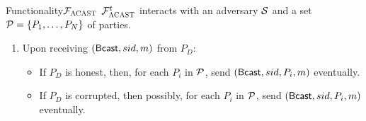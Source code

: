 \documentclass{llncs}
\begin{document}
\begin{boxdef}{Functionality}{$\mathcal{{F}}_{\textsc{ACAST}}$}
  $\mathcal{{F}}_{\textsc{ACAST}}^t$ interacts with an adversary $\mathcal{{S}}$ and a set $\mathcal{{P}} = \{
  P_1, \ldots, P_N \}$ of parties.
  \begin{enumerate}
    \item Upon receiving $({\sf Bcast}, sid, m)$ from $P_D$:
    
    \begin{itemize}
      \item If $P_D$ is honest, then, for each $P_i$ in $\mathcal{{P}}$, send $({\sf
      Bcast}, sid, P_i, m)$ eventually.
      
      \item If $P_D$ is corrupted, then possibly, for each $P_i$ in $\mathcal{{P}}$,
      send $({\sf Bcast}, sid, P_i, m)$ eventually.
      \end{itemize}
  \end{enumerate}
\end{boxdef}

\begin{comment}
\begin{boxdef}{Functionality}{$\Func{ACAST}(D, P_1, \ldots, P_N)$}
  Assume $N > 3f$ for $f$ Byzantine failures.
  \begin{enumerate}[leftmargin=0cm]
    \item[] On send(x) from $D$:
    \begin{itemize}
      \item[] If $D$ is honest:
      \begin{itemize}
        \item[] For each $P_i$:
        \begin{itemize}
          \item[] Eventually send(x) to $P_i$.
        \end{itemize}
      \end{itemize}

      \item[] If $D$ is corrupt:
      \begin{itemize}
      \item[] Possibly:
        \begin{itemize}
          \item[] For each $P_i$:
          \begin{itemize}
            \item[] Eventually send(x) to $P_i$.
          \end{itemize}
        \end{itemize}
      \end{itemize}
    \end{itemize}
  \end{enumerate}
\end{boxdef}
\end{comment}
\end{document}
